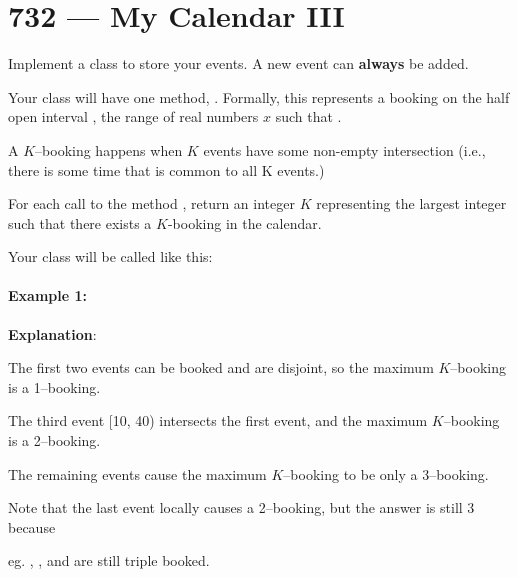 \section{732 --- My Calendar III}
Implement a  class to store your events. A new event can \textbf{always} be added.

Your class will have one method, . Formally, this represents a booking on the half open interval \fcj{[start, end)}, the range of real numbers $x$ such that .

A $K$--booking happens when $K$ events have some non-empty intersection (i.e., there is some time that is common to all K events.)

For each call to the method , return an integer $K$ representing the largest integer such that there exists a $K$-booking in the calendar.

Your class will be called like this: 



\paragraph{Example 1:}
\begin{flushleft}










\textbf{Explanation}: 

The first two events can be booked and are disjoint, so the maximum $K$--booking is a 1--booking.

The third event [10, 40) intersects the first event, and the maximum $ K $--booking is a 2--booking.

The remaining events cause the maximum $K$--booking to be only a 3--booking.

Note that the last event locally causes a 2--booking, but the answer is still 3 because

eg. \fcj{[10, 20)}, \fcj{[10, 40)}, and \fcj{[5, 15)} are still triple booked.
\end{flushleft}
 

